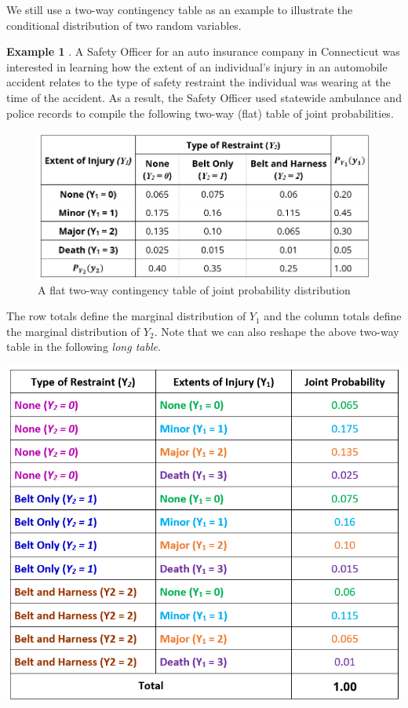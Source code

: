 \documentclass[
]{book}
\begin{document}
We still use a two-way contingency table as an example to illustrate the conditional distribution of two random variables.

\textbf{Example 1} . A Safety Officer for an auto insurance company in Connecticut was interested in learning how the extent of an individual's injury in an automobile accident relates to the type of safety restraint the individual was wearing at the time of the accident. As a result, the Safety Officer used statewide ambulance and police records to compile the following two-way (flat) table of joint probabilities.

\begin{figure}

{\centering \includegraphics[width=0.65\linewidth]{topic07/example1TwoWayTableInsurance} 

}

\caption{A flat two-way contingency table of joint probability distribution}\label{fig:unnamed-chunk-106}
\end{figure}

The row totals define the marginal distribution of \(Y_1\) and the column totals define the marginal distribution of \(Y_2\). Note that we can also reshape the above two-way table in the following \emph{long table}.

\begin{center}\includegraphics[width=0.65\linewidth]{topic07/example1TwoWayLongTable} \end{center}
\end{document}
